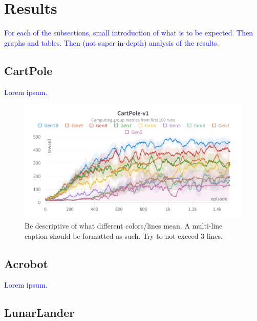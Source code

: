 \documentclass{article}
\newcommand{\TODO}[1]{\textcolor{blue}{#1}}
\begin{document}
\section{Results}
\label{sec:res}

\TODO{
    For each of the subsections, small introduction of what is to be expected.
    Then graphs and tables.
    Then (not super in-depth) analysis of the results.
}

\subsection{CartPole}
\label{ssec:cp}

\TODO{Lorem ipsum.}

\begin{figure}[htbp]
    \centering
    \includegraphics[width=0.9\linewidth]{figs/lc-cp.png}
    \caption{
        Be descriptive of what different colors/lines mean.
        A multi-line caption should be formatted as such.
        Try to not exceed 3 lines.
    }
    \label{fig:lc-cp}
\end{figure}

\subsection{Acrobot}
\label{ssec:ab}

\TODO{Lorem ipsum.}

\subsection{LunarLander}
\label{ssec:ll}
\end{document}

